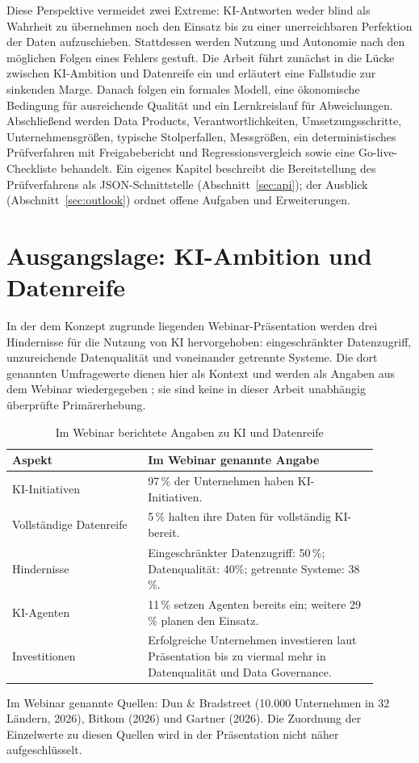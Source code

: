 \documentclass[a4paper,12pt]{article}
\theoremstyle{definition}
\begin{document}
Diese Perspektive vermeidet zwei Extreme: KI-Antworten weder blind als Wahrheit zu übernehmen noch den Einsatz bis zu einer unerreichbaren Perfektion der Daten aufzuschieben. Stattdessen werden Nutzung und Autonomie nach den möglichen Folgen eines Fehlers gestuft. Die Arbeit führt zunächst in die Lücke zwischen KI-Ambition und Datenreife ein und erläutert eine Fallstudie zur sinkenden Marge. Danach folgen ein formales Modell, eine ökonomische Bedingung für ausreichende Qualität und ein Lernkreislauf für Abweichungen. Abschließend werden Data Products, Verantwortlichkeiten, Umsetzungsschritte, Unternehmensgrößen, typische Stolperfallen, Messgrößen, ein deterministisches Prüfverfahren mit Freigabebericht und Regressionsvergleich sowie eine Go-live-Checkliste behandelt. Ein eigenes Kapitel beschreibt die Bereitstellung des Prüfverfahrens als JSON-Schnittstelle (Abschnitt~\ref{sec:api}); der Ausblick (Abschnitt~\ref{sec:outlook}) ordnet offene Aufgaben und Erweiterungen.

\section{Ausgangslage: KI-Ambition und Datenreife}
\label{sec:starting-point}

In der dem Konzept zugrunde liegenden Webinar-Präsentation werden drei Hindernisse für die Nutzung von KI hervorgehoben: eingeschränkter Datenzugriff, unzureichende Datenqualität und voneinander getrennte Systeme. Die dort genannten Umfragewerte dienen hier als Kontext und werden als Angaben aus dem Webinar wiedergegeben \cite{webinar2026}; sie sind keine in dieser Arbeit unabhängig überprüfte Primärerhebung.

\begin{table}[htbp]
\centering
\small
\caption{Im Webinar berichtete Angaben zu KI und Datenreife}
\label{tab:readiness}
\begin{tabular}{p{0.33\linewidth}p{0.57\linewidth}}
\toprule
\textbf{Aspekt} & \textbf{Im Webinar genannte Angabe} \\
\midrule
KI-Initiativen & 97\,\% der Unternehmen haben KI-Initiativen. \\
Vollständige Datenreife & 5\,\% halten ihre Daten für vollständig KI-bereit. \\
Hindernisse & Eingeschränkter Datenzugriff: 50\,\%; Datenqualität: 40\%; getrennte Systeme: 38\,\%. \\
KI-Agenten & 11\,\% setzen Agenten bereits ein; weitere 29\,\% planen den Einsatz. \\
Investitionen & Erfolgreiche Unternehmen investieren laut Präsentation bis zu viermal mehr in Datenqualität und Data Governance. \\
\bottomrule
\end{tabular}
\end{table}
\noindent\footnotesize Im Webinar genannte Quellen: Dun \& Bradstreet (10.000 Unternehmen in 32 Ländern, 2026), Bitkom (2026) und Gartner (2026). Die Zuordnung der Einzelwerte zu diesen Quellen wird in der Präsentation nicht näher aufgeschlüsselt.\normalsize
\end{document}
